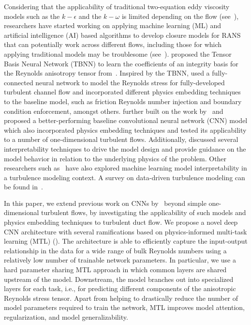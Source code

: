 \documentclass[11pt]{article}
\numberwithin{equation}{section}
\theoremstyle{plain}
\theoremstyle{definition}
\begin{document}
Considering that the applicability of traditional two-equation eddy viscosity models such as the $k-\epsilon$ and the $k-\omega$ is limited depending on the flow (see~\cite{speziale,johansson2002engineering, chen2003extended, gatski2004constitutive}), researchers have started working on applying machine learning (ML) and artificial intelligence (AI) based algorithms to develop closure models for RANS that can potentially work across different flows, including those for which applying traditional models may be troublesome (see~\cite{ling_ml,ling2016reynolds,fang2018deep,PhysRevFluids.3.074602,Kaandorp2018MachineLF,song,KAANDORP2020104497,zhu2020datadriven}). \cite{ling2016reynolds} proposed the Tensor Basis Neural Network (TBNN) to learn the coefficients of an integrity basis for the Reynolds anisotropy tensor from~\cite{pope_1975}. Inspired by the TBNN, \cite{fang2018deep} used a fully-connected neural network to model the Reynolds stress for fully-developed turbulent channel flow and incorporated different physics embedding techniques to the baseline model, such as friction Reynolds number injection and boundary condition enforcement, amongst others. \cite{borde2021convolutional} further built on the work by~\cite{fang2018deep} and proposed a better-performing baseline convolutional neural network (CNN) model which also incorporated physics embedding techniques and tested its applicability to a number of one-dimensional turbulent flows. Additionally, \cite{borde2021convolutional} discussed several interpretability techniques to drive the model design and provide guidance on the model behavior in relation to the underlying physics of the problem. Other researchers such as~\cite{jiang} have also explored machine learning model interpretability in a turbulence modeling context. A survey on data-driven turbulence modeling can be found in~\cite{duraisamy}. 

In this paper, we extend previous work on CNNs by~\cite{borde2021convolutional} beyond simple one-dimensional turbulent flows, by investigating the applicability of such models and physics embedding techniques to turbulent duct flow. We propose a novel deep CNN architecture with several ramifications based on physics-informed multi-task learning (MTL) (\cite{multi-task_learning,mt_thung,zhang2021surveymt}). The architecture is able to efficiently capture the input-output relationship in the data for a wide range of bulk Reynolds numbers using a relatively low number of trainable network parameters. In particular, we use a hard parameter sharing MTL approach in which common layers are shared upstream of the model. Downstream, the model branches out into specialized layers for each task, i.e., for predicting different components of the anisotropic Reynolds stress tensor. Apart from helping to drastically reduce the number of model parameters required to train the network, MTL improves model attention, regularization, and model generalizability. 
\end{document}

